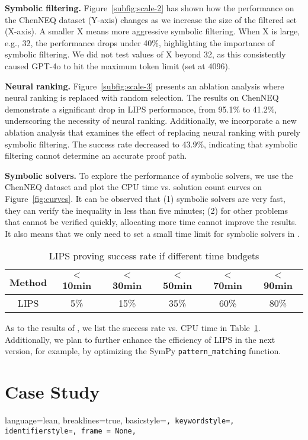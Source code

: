 {\bf Symbolic filtering.} Figure~\ref{subfig:scale-2} has shown how the performance on the ChenNEQ dataset (Y-axis) changes as we increase the size of the filtered set (X-axis). A smaller X means more aggressive symbolic filtering. When X is large, e.g., 32, the performance drops under 40\%, highlighting the importance of symbolic filtering. We did not test values of X beyond 32, as this consistently caused GPT-4o to hit the maximum token limit (set at 4096).

{\bf Neural ranking.} Figure~\ref{subfig:scale-3} presents an ablation analysis where neural ranking is replaced with random selection. The results on ChenNEQ demonstrate a significant drop in LIPS performance, from 95.1\% to 41.2\%, underscoring the necessity of neural ranking. Additionally, we incorporate a new ablation analysis that examines the effect of replacing neural ranking with purely symbolic filtering.
The success rate decreased to 43.9\%, indicating that symbolic filtering cannot determine an accurate proof path.

{\bf Symbolic solvers.} To explore the performance of symbolic solvers, we use the ChenNEQ dataset and plot the CPU time vs. solution count curves on Figure~\ref{fig:curves}. 
It can be observed that (1) symbolic solvers are very fast, they can verify the inequality in less than five minutes; (2) for other problems that cannot be verified quickly, allocating more time cannot improve the results.
It also means that we only need to set a small time limit for symbolic solvers in \name.

\begin{table}[ht]
\centering
\caption{LIPS proving success rate if different time budgets}
\label{tab:lips_curves}
\vspace{-0.75em}
\begin{threeparttable}
\begin{tabular}{cccccc}
\toprule
Method & $<$10min & $<$30min & $<$50min & $<$70min & $<$90min \\
\midrule
LIPS & 5\% & 15\% & 35\% & 60\% & 80\% \\
\bottomrule
\end{tabular}
\end{threeparttable}
\end{table}

As to the results of \name, we list the success rate vs. CPU time in Table~\ref{tab:lips_curves}.
Additionally, we plan to further enhance the efficiency of LIPS in the next version, for example, by optimizing the SymPy \texttt{pattern\_matching} function.


\section{Case Study}
\label{app:exp_results}

\lstset
{
    language=lean,
    breaklines=true,
    basicstyle=\tt\small,
    keywordstyle=\color{blue},
    identifierstyle=\color{magenta},
    frame = None,
}








